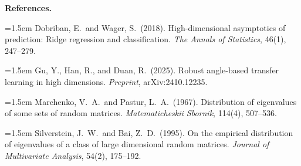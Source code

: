 \documentclass[11pt]{article}
\theoremstyle{definition}
\begin{document}
\bigskip
\noindent\textbf{References.}
 
\medskip\noindent
\hangindent=1.5em
Dobriban, E.\ and Wager, S.\ (2018).
High-dimensional asymptotics of prediction: Ridge regression and
classification.
\textit{The Annals of Statistics}, 46(1), 247--279.
 
\medskip\noindent
\hangindent=1.5em
Gu, Y., Han, R., and Duan, R.\ (2025).
Robust angle-based transfer learning in high dimensions.
\textit{Preprint}, arXiv:2410.12235.
 
\medskip\noindent
\hangindent=1.5em
Marchenko, V.~A.\ and Pastur, L.~A.\ (1967).
Distribution of eigenvalues of some sets of random matrices.
\textit{Matematicheskii Sbornik}, 114(4), 507--536.
 
\medskip\noindent
\hangindent=1.5em
Silverstein, J.~W.\ and Bai, Z.~D.\ (1995).
On the empirical distribution of eigenvalues of a class of large
dimensional random matrices.
\textit{Journal of Multivariate Analysis}, 54(2), 175--192.
 
\end{document}
